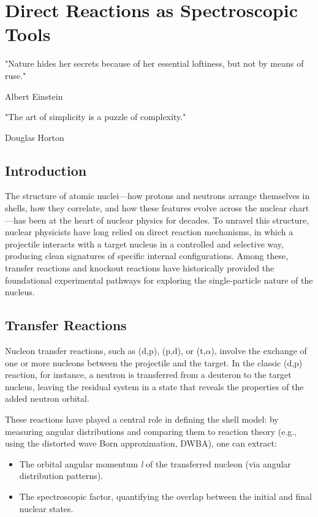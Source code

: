 
%

\chapter{Direct Reactions as Spectroscopic Tools}
\label{cha:reactions}

\epigraph{
	"Nature hides her secrets because of her essential loftiness, but not by means of ruse."
}{Albert Einstein}

\epigraph{
	"The art of simplicity is a puzzle of complexity."
}{Douglas Horton}



\section{Introduction}
\label{sec:introduction}

The structure of atomic nuclei—how protons and neutrons arrange themselves in shells, how they correlate, and how these features evolve across the nuclear chart—has been at the heart of nuclear physics for decades. To unravel this structure, nuclear physicists have long relied on direct reaction mechanisms, in which a projectile interacts with a target nucleus in a controlled and selective way, producing clean signatures of specific internal configurations. Among these, transfer reactions and knockout reactions have historically provided the foundational experimental pathways for exploring the single-particle nature of the nucleus.


\section{Transfer Reactions}
\label{sec:transfer_reactions}

Nucleon transfer reactions, such as (d,p), (p,d), or (t,$\alpha$), involve the exchange of one or more nucleons between the projectile and the target. In the classic (d,p) reaction, for instance, a neutron is transferred from a deuteron to the target nucleus, leaving the residual system in a state that reveals the properties of the added neutron orbital.

These reactions have played a central role in defining the shell model: by measuring angular distributions and comparing them to reaction theory (e.g., using the distorted wave Born approximation, DWBA), one can extract:
\begin{itemize}
	\item The orbital angular momentum \emph{l} of the transferred nucleon (via angular distribution patterns).
	\item The spectroscopic factor, quantifying the overlap between the initial and final nuclear states.
\end{itemize}


